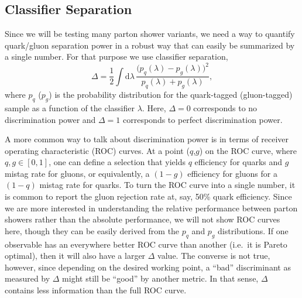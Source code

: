 \documentclass[11pt]{cernrep}
\begin{document}
\subsection{Classifier Separation}
\label{quarkgluon_sec:classsep}

Since we will be testing many parton shower variants, we need a way to quantify quark/gluon separation power in a robust way that can easily be summarized by a single number.  For that purpose we use classifier separation,
\begin{equation}
\label{quarkgluon_eq:deltadef}
\Delta =  \frac{1}{2} \int \text{d} \lambda \, \frac{\bigl(p_q(\lambda) - p_g(\lambda)\bigr)^2}{p_q(\lambda) + p_g(\lambda)},
\end{equation}
where $p_q$ ($p_g$) is the probability distribution for the quark-tagged (gluon-tagged) sample as a function of the classifier $\lambda$.  Here, $\Delta = 0$ corresponds to no discrimination power and $\Delta = 1$ corresponds to perfect discrimination power.

A more common way to talk about discrimination power is in terms of receiver operating characteristic (ROC) curves.  At a point ($q$,$g$) on the ROC curve, where $q,g \in [0,1]$, one can define a selection that yields $q$ efficiency for quarks and $g$ mistag rate for gluons, or equivalently, a $(1-g)$ efficiency for gluons for a $(1-q)$ mistag rate for quarks.  To turn the ROC curve into a single number, it is common to report the gluon rejection rate at, say, 50\% quark efficiency.  Since we are more interested in understanding the relative performance between parton showers rather than the absolute performance, we will not show ROC curves here, though they can be easily derived from the $p_q$ and $p_g$ distributions.  If one observable has an everywhere better ROC curve than another (i.e.~it is Pareto optimal), then it will also have a larger $\Delta$ value.  The converse is not true, however, since depending on the desired working point, a ``bad'' discriminant as measured by $\Delta$ might still be ``good'' by another metric.  In that sense, $\Delta$ contains less information than the full ROC curve.
\end{document}

